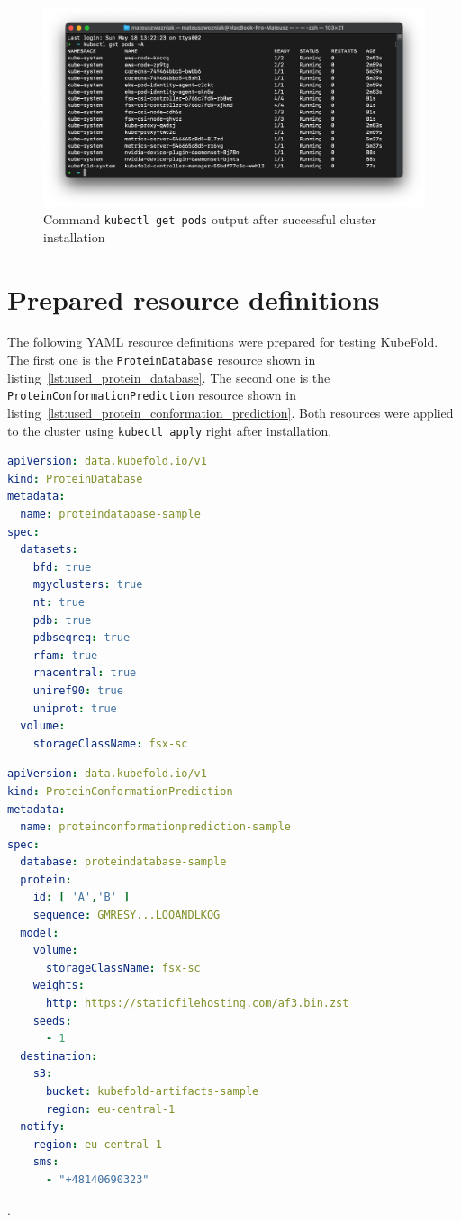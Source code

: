 \begin{figure}[htbp]
    \centering
    \includegraphics[width=\textwidth]{images/eks_pods_terminal}
    \caption{Command \texttt{kubectl get pods} output after successful cluster installation}
    \label{fig:eks_pods_terminal}
\end{figure}

\section{Prepared resource definitions}

The following YAML resource definitions were prepared for testing KubeFold.
The first one is the \texttt{ProteinDatabase} resource shown in listing~\ref{lst:used_protein_database}.
The second one is the \texttt{ProteinConformationPrediction} resource shown in listing~\ref{lst:used_protein_conformation_prediction}.
Both resources were applied to the cluster using \texttt{kubectl apply} right after installation.

\begin{lstlisting}[language=yaml,caption={Used \texttt{ProteinDatabase} resource definition},label={lst:used_protein_database}]
apiVersion: data.kubefold.io/v1
kind: ProteinDatabase
metadata:
  name: proteindatabase-sample
spec:
  datasets:
    bfd: true
    mgyclusters: true
    nt: true
    pdb: true
    pdbseqreq: true
    rfam: true
    rnacentral: true
    uniref90: true
    uniprot: true
  volume:
    storageClassName: fsx-sc
\end{lstlisting}

\begin{lstlisting}[language=yaml,caption={Used \texttt{ProteinConformationPrediction} resource definition},label={lst:used_protein_conformation_prediction}]
apiVersion: data.kubefold.io/v1
kind: ProteinConformationPrediction
metadata:
  name: proteinconformationprediction-sample
spec:
  database: proteindatabase-sample
  protein:
    id: [ 'A','B' ]
    sequence: GMRESY...LQQANDLKQG
  model:
    volume:
      storageClassName: fsx-sc
    weights:
      http: https://staticfilehosting.com/af3.bin.zst
    seeds:
      - 1
  destination:
    s3:
      bucket: kubefold-artifacts-sample
      region: eu-central-1
  notify:
    region: eu-central-1
    sms:
      - "+48140690323"
\end{lstlisting}.

